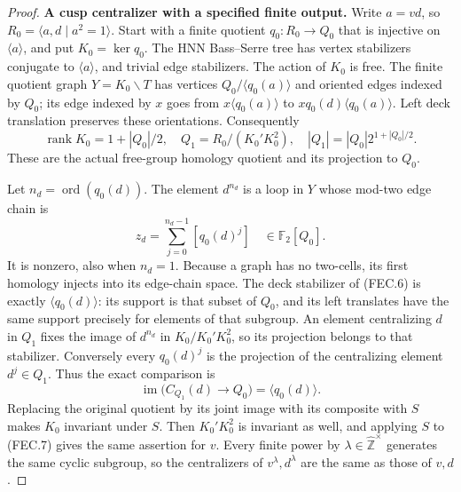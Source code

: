 \begin{proof}
\par\medskip\noindent\textbf{A cusp centralizer with a specified finite output.}\quad
Write $a=vd$, so $R_0=\langle a,d\mid a^2=1\rangle$.
Start with a finite quotient $q_0:R_0\to Q_0$ that is
injective on $\langle a\rangle$, and put $K_0=\ker q_0$.
The HNN Bass--Serre tree has vertex stabilizers conjugate to
$\langle a\rangle$, and trivial edge stabilizers.  The action
of $K_0$ is free.  The finite quotient graph $Y=K_0\backslash T$
has vertices $Q_0/\langle q_0(a)\rangle$ and oriented edges
indexed by $Q_0$; its edge indexed by $x$ goes from
$x\langle q_0(a)\rangle$ to
$xq_0(d)\langle q_0(a)\rangle$.
Left deck translation preserves these orientations.
Consequently
\[
 \operatorname{rank}K_0=1+|Q_0|/2,
 \quad Q_1=R_0/(K_0'K_0^2),
 \quad |Q_1|=|Q_0|2^{1+|Q_0|/2}.
                                                               \tag{FEC.5}
\]
These are the actual free-group homology quotient and its
projection to $Q_0$.

Let $n_d=\operatorname{ord}(q_0(d))$.  The element $d^{n_d}$
is a loop in $Y$ whose mod-two edge chain is
\[
          z_d=\sum_{j=0}^{n_d-1}[q_0(d)^j]
                          \quad\in\mathbb F_2[Q_0].
                                                               \tag{FEC.6}
\]
It is nonzero, also when $n_d=1$.  Because a graph has no
two-cells, its first homology injects into its edge-chain
space.  The deck stabilizer of (FEC.6) is exactly
$\langle q_0(d)\rangle$: its support is that subset of
$Q_0$, and its left translates have the same support
precisely for elements of that subgroup.
An element centralizing $d$ in $Q_1$ fixes the image of
$d^{n_d}$ in $K_0/K_0'K_0^2$, so its projection belongs
to that stabilizer.  Conversely every $q_0(d)^j$ is the
projection of the centralizing element $d^j\in Q_1$.
Thus the exact comparison is
\[
 \operatorname{im}\bigl(C_{Q_1}(d)\longrightarrow Q_0\bigr)
                         =\langle q_0(d)\rangle.
                                                               \tag{FEC.7}
\]
Replacing the original quotient by its joint image with
its composite with $S$ makes $K_0$ invariant under $S$.
Then $K_0'K_0^2$ is invariant as well, and applying $S$
to (FEC.7) gives the same assertion for $v$.
Every finite power by $\lambda\in\widehat{\mathbb Z}^{\times}$
generates the same cyclic subgroup, so the centralizers
of $v^\lambda,d^\lambda$ are the same as those of $v,d$.


\end{proof}

